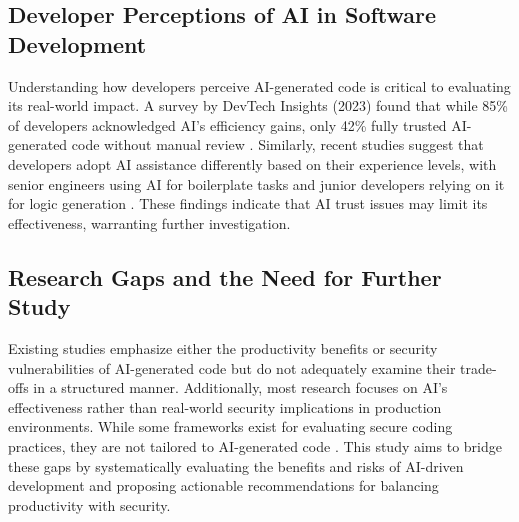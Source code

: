 \subsection{Developer Perceptions of AI in Software Development}
Understanding how developers perceive AI-generated code is critical to evaluating its real-world impact. A survey by DevTech Insights (2023) found that while 85\% of developers acknowledged AI’s efficiency gains, only 42\% fully trusted AI-generated code without manual review \cite{devtech2023}. Similarly, recent studies suggest that developers adopt AI assistance differently based on their experience levels, with senior engineers using AI for boilerplate tasks and junior developers relying on it for logic generation \cite{developer-adoption}. These findings indicate that AI trust issues may limit its effectiveness, warranting further investigation.

\subsection{Research Gaps and the Need for Further Study}
Existing studies emphasize either the productivity benefits or security vulnerabilities of AI-generated code but do not adequately examine their trade-offs in a structured manner. Additionally, most research focuses on AI’s effectiveness rather than real-world security implications in production environments. While some frameworks exist for evaluating secure coding practices, they are not tailored to AI-generated code \cite{secure-frameworks2023}. This study aims to bridge these gaps by systematically evaluating the benefits and risks of AI-driven development and proposing actionable recommendations for balancing productivity with security.
